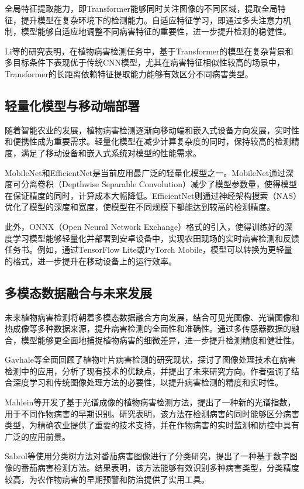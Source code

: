 全局特征提取能力，即Transformer能够同时关注图像的不同区域，提取全局特征，提升模型在复杂环境下的检测能力。自适应特征学习，即通过多头注意力机制，模型能够自适应地调整不同病害特征的重要性，进一步提升检测的稳健性。

Li等\cite{14}的研究表明，在植物病害检测任务中，基于Transformer的模型在复杂背景和多目标条件下表现优于传统CNN模型，尤其在病害特征相似性较高的场景中，Transformer的长距离依赖特征提取能力能够有效区分不同病害类型。

\subsection{轻量化模型与移动端部署}
随着智能农业的发展，植物病害检测逐渐向移动端和嵌入式设备方向发展，实时性和便携性成为重要需求。轻量化模型在减少计算复杂度的同时，保持较高的检测精度，满足了移动设备和嵌入式系统对模型的性能需求。

MobileNet和EfficientNet是当前应用最广泛的轻量化模型之一。MobileNet通过深度可分离卷积（Depthwise Separable Convolution）减少了模型参数量，使得模型在保证精度的同时，计算成本大幅降低。EfficientNet则通过神经架构搜索（NAS）优化了模型的深度和宽度，使模型在不同规模下都能达到较高的检测精度。

此外，ONNX（Open Neural Network Exchange）格式的引入，使得训练好的深度学习模型能够轻量化并部署到安卓设备中，实现农田现场的实时病害检测和反馈任务书。例如，通过TensorFlow Lite或PyTorch Mobile，模型可以转换为更轻量的格式，进一步提升在移动设备上的运行效率。

\subsection{多模态数据融合与未来发展}
未来植物病害检测将朝着多模态数据融合方向发展，结合可见光图像、光谱图像和热成像等多种数据来源，提升病害检测的全面性和准确性。通过多传感器数据的融合，模型能够更全面地捕捉植物病害的细微差异，进一步提升检测精度和健壮性。

Gavhale等\cite{26}全面回顾了植物叶片病害检测的研究现状，探讨了图像处理技术在病害检测中的应用，分析了现有技术的优缺点，并提出了未来研究方向。作者强调了结合深度学习和传统图像处理方法的必要性，以提升病害检测的精度和实时性。

Mahlein等\cite{20}开发了基于光谱成像的植物病害检测方法，提出了一种新的光谱指数，用于不同作物病害的早期识别。研究表明，该方法在检测病害的同时能够区分病害类型，为精确农业提供了重要的技术支持，并在作物病害的实时监测和防控中具有广泛的应用前景。

Sabrol等\cite{24}使用分类树方法对番茄病害图像进行了分类研究，提出了一种基于数字图像的番茄病害检测方法。结果表明，该方法能够有效识别多种病害类型，分类精度较高，为农作物病害的早期预警和防治提供了实用工具。


